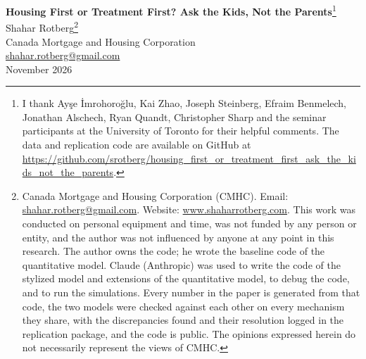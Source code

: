 \documentclass[12pt]{article}
\begin{document}
\begin{center}
\renewcommand{\thefootnote}{\fnsymbol{footnote}}
{\Large\bfseries Housing First or Treatment First? Ask the Kids, Not the Parents}\footnote{I thank Ay\c{s}e \.{I}mrohoro\u{g}lu, Kai Zhao, Joseph Steinberg, Efraim Benmelech, Jonathan Alschech, Ryan Quandt, Christopher Sharp and the seminar participants at the University of Toronto for their helpful comments. The data and replication code are available on GitHub at \url{https://github.com/srotberg/housing_first_or_treatment_first_ask_the_kids_not_the_parents}.}\\[1.4em]
{\large Shahar Rotberg}\footnote{Canada Mortgage and Housing Corporation (CMHC). Email: \url{shahar.rotberg@gmail.com}. Website: \url{www.shaharrotberg.com}. This work was conducted on personal equipment and time, was not funded by any person or entity, and the author was not influenced by anyone at any point in this research. The author owns the code; he wrote the baseline code of the quantitative model. Claude (Anthropic) was used to write the code of the stylized model and extensions of the quantitative model, to debug the code, and to run the simulations. Every number in the paper is generated from that code, the two models were checked against each other on every mechanism they share, with the discrepancies found and their resolution logged in the replication package, and the code is public. The opinions expressed herein do not necessarily represent the views of CMHC.}\\[0.6em]
Canada Mortgage and Housing Corporation\\
\href{mailto:shahar.rotberg@gmail.com}{shahar.rotberg@gmail.com}\\[1em]
November 2026
\end{center}
\renewcommand{\thefootnote}{\arabic{footnote}}
\setcounter{footnote}{0}
\end{document}

